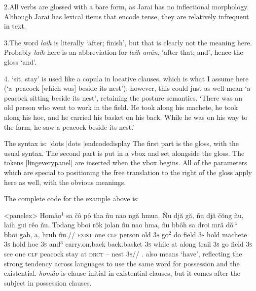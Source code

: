 2.\enspace All verbs are glossed with a bare form, as Jarai has
no inflectional morphology. Although Jarai has lexical items that
encode tense, they are relatively infrequent in text.

3.\enspace The word {\it laih} is literally `after; finish', but
that is clearly not the meaning here. Probably {\it laih} here is
an abbreviation for {\it laih an\u{u}n}, `after that; and', hence
the gloss `and'.

4. `sit, stay' is used like a copula in
locative clauses, which is what I assume here (`a~peacock
[which was] beside its nest'); however, this could just as well
mean `a peacock sitting beside its nest', retaining the posture
semantics.
\endpanel
\bigskip
`There was an old person who went to work in the field. He took
along his machete, he took along his hoe, and he carried his
basket on his back. While he was on his way to the farm, he saw a
peacock beside its nest.'
\xe
\endframedisplay

The syntax is:
\codedisplay
\beginglpanel |dots \endgl |dots \endpanel
|endcodedisplay
The first part is the gloss, with the usual syntax.  The second
part is put in a vbox and set alongside the gloss. The tokens
|lingeverypanel| are inserted when the vbox begins. All of the
parameters which are special to positioning the free translation
to the right of the gloss apply here as well, with the obvious
meanings.

The complete code for the example above is:

\codedisplay
\ex[everypanel=\footnotesize]<panelex>
\def\\#1{{\footnotesize\uppercase{#1}}}%
\let\\=\textsc
\beginglpanel[ssratio=.5,glhangstyle=none]
\gla Hom\^{a}o$^1$ sa \v{c}\^{o} p\^{o} tha  \~{n}u nao ng\u{a}
hmua. \~{N}u dj\u{a} g\u{a}, \~{n}u dj\u{a} \v{c}\u{o}ng \~{n}u,
laih gui r\^{e}o \~{n}u. Todang bboi r\^{o}k jolan \~{n}u nao
hma, \~{n}u bb\^{o}h sa droi mr\u{a} d\u{o}$\,^4$ bboi gah, a, hruh
\~{n}u.//
\glb \\{exist} one \\{clf} person old \\{3s} go$^2$ do field
\\{3s} hold machete \\{3s} hold hoe \\{3s} and$^3$ carry.on.back
back.basket \\{3s} while at along trail \\{3s} go field \\{3s}
see one \\{clf} peacock stay at \\{drct} -- nest \\{3s}//
. also means `have', reflecting the
strong tendency across languages to use the same word for
possession and the existential. {\it hom\^{a}o} is clause-initial
in existential clauses, but it comes after the subject in
possession clauses.

